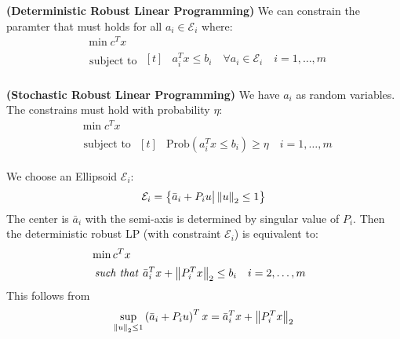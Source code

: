 \begin{definition}{\textbf{(Deterministic Robust Linear Programming)}}
    We can constrain the paramter that must holds for all $a_i\in\mathcal{E}_i$ where:
    \begin{equation*}
    \begin{aligned}
        &\min c^Tx \\
        &\text{ subject to } \begin{aligned}[t]
            &a_i^Tx\le b_i \quad \forall a_i\in\mathcal{E}_i \quad i=1,\dots,m \\
        \end{aligned}
    \end{aligned}
    \end{equation*}
\end{definition}

\begin{definition}{\textbf{(Stochastic Robust Linear Programming)}}
    We have $a_i$ as random variables. The constrains must hold with probability $\eta$:
    \begin{equation*}
    \begin{aligned}
        &\min c^Tx \\
        &\text{ subject to } \begin{aligned}[t]
            &\text{Prob}(a^T_ix\le b_i)\ge\eta \quad i=1,\dots,m
        \end{aligned}
    \end{aligned}
    \end{equation*}
\end{definition}

\begin{proposition}
    We choose an Ellipsoid $\mathcal{E}_i$: 
    \begin{equation*}
        \mathcal{E}_i = \left\{ \bar{a}_i + P_iu \big| \left\lVert u\right\rVert_2\le1 \right\}
    \end{equation*}
    The center is $\bar{a}_i$ with the semi-axis is determined by singular value of $P_i$. Then the deterministic robust LP (with constraint $\mathcal{E}_i$) is equivalent to:  
    \begin{equation*}
    \begin{aligned}
        &\min c^Tx \\
        &\text{\emph{ such that }} \begin{aligned}[t]
            &\bar{a}^T_ix + \left\lVert P_i^T x\right\rVert_2 \le b_i \quad i=2,\dots,m
        \end{aligned}
    \end{aligned}
    \end{equation*}
    This follows from 
    \begin{equation*}
        \sup_{\left\lVert u\right\rVert_2\le1} \left( \bar{a}_i + P_iu \right)^Tx = \bar{a}^T_ix+\left\lVert P^T_ix\right\rVert_2
    \end{equation*}
\end{proposition}

